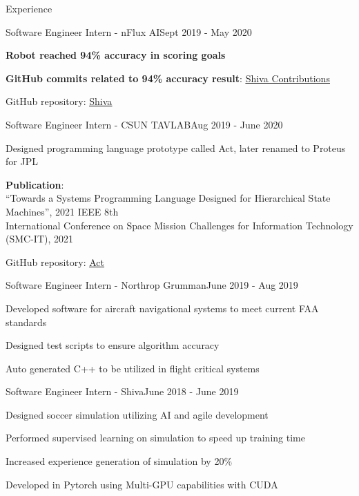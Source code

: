 \documentclass{resume}
\begin{document}
\begin{rSection}{Experience}
\begin{rSubsection}{Software Engineer Intern - nFlux AI}{Sept 2019 - May 2020}
        \item \textbf{Robot reached 94\% accuracy in scoring goals}
        \item \textbf{GitHub commits related to 94\% accuracy result}: \href{https://github.com/nflux/Shiva/commits/rc-mpi-pbt-testing?author=nflux-dtellier}{\color{blue}\underline{Shiva Contributions}}
        \item GitHub repository: \href{https://github.com/nflux/Shiva}{\color{blue}\underline{Shiva}}
    \end{rSubsection}
    \begin{rSubsection}{Software Engineer Intern - CSUN TAVLAB}{Aug 2019 - June 2020}
        \item Designed programming language prototype called Act, later renamed to Proteus for JPL
        \item \textbf{Publication}: \\
          ``Towards a Systems Programming Language Designed for Hierarchical State Machines'', 2021 IEEE 8th \\
          \quad International Conference on Space Mission Challenges for Information Technology (SMC-IT), 2021
        \item GitHub repository: \href{https://github.com/csun-comp430-s20/act}{\color{blue}\underline{Act}}
    \end{rSubsection}
    \begin{rSubsection}{Software Engineer Intern - Northrop Grumman}{June 2019 - Aug 2019}
        \item Developed software for aircraft navigational systems to meet current FAA standards
        \item Designed test scripts to ensure algorithm accuracy
        \item Auto generated C++ to be utilized in flight critical systems
    \end{rSubsection}
    \begin{rSubsection}{Software Engineer Intern - Shiva}{June 2018 - June 2019}
        \item Designed soccer simulation utilizing AI and agile development
        \item Performed supervised learning on simulation to speed up training time
        \item Increased experience generation of simulation by 20\%
        \item Developed in Pytorch using Multi-GPU capabilities with CUDA
    \end{rSubsection}
\end{rSection}
\end{document}
